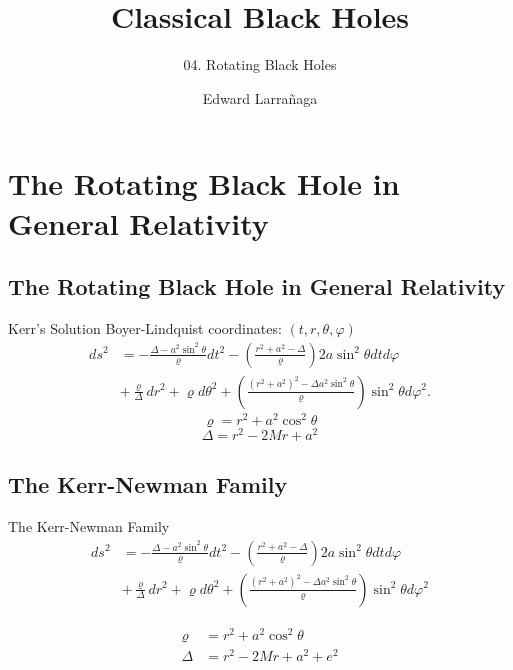 \documentclass{beamer}
\title{Classical Black Holes} %
\subtitle{04. Rotating Black Holes} %
\author{Edward Larra\~{n}aga}
\begin{document}
  \frame{\maketitle}

    \section{The Rotating Black Hole in General Relativity}
    
    \subsection{The Rotating Black Hole in General Relativity}
    	\begin{frame}{Kerr's Solution}
    		Boyer-Lindquist coordinates: $\left(t,r,\theta,\varphi\right)$
            \pause
            \begin{align*}
            ds^{2} &= -\frac{\Delta-a^{2}\sin^{2}\theta}{\varrho}dt^{2}-\left(\frac{r^{2}+a^{2}-\Delta}{\varrho}\right)2a\sin^{2}\theta dtd\varphi\nonumber \\
             & +\frac{\varrho}{\Delta}dr^{2}+\varrho d\theta^{2}+\left(\frac{\left(r^{2}+a^{2}\right)^{2}-\Delta a^{2}\sin^{2}\theta}{\varrho}\right)\sin^{2}\theta d\varphi^{2}.
            \end{align*}
            \pause
            $$\varrho  = r^{2}+a^{2}\cos^{2}\theta$$
            $$\Delta =  r^{2}-2Mr+a^{2}$$
    	\end{frame}

	\subsection{The Kerr-Newman Family}
         \begin{frame}{The Kerr-Newman Family}
            \begin{align*}
			ds^{2} &= -\frac{\Delta-a^{2}\sin^{2}\theta}{\varrho}dt^{2}-\left(\frac{r^{2}+a^{2}-\Delta}{\varrho}\right)2a\sin^{2}\theta dtd\varphi\nonumber \\
 & +\frac{\varrho}{\Delta}dr^{2}+\varrho d\theta^{2}+\left(\frac{\left(r^{2}+a^{2}\right)^{2}-\Delta a^{2}\sin^{2}\theta}{\varrho}\right)\sin^{2}\theta d\varphi^{2}
			\end{align*}

			\begin{align*}
            \varrho &=  r^{2}+a^{2}\cos^{2}\theta\\
            \Delta &=  r^{2}-2Mr+a^{2}+e^{2}
            \end{align*}
        \end{frame}
        
\end{document}
